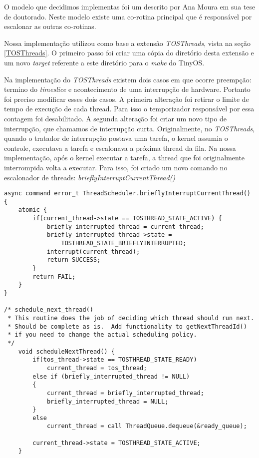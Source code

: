 O modelo que decidimos implementas foi um descrito por Ana Moura em sua tese de doutorado\cite[s. 6.2]{Moura/04}.
Neste modelo existe uma co-rotina principal que é responsável por escalonar as outras co-rotinas.

Nossa implementação utilizou como base a extensão \textit{TOSThreads}, vista na seção \ref{TOSThreads}. O primeiro passo
foi criar uma cópia do diretório desta extensão e um novo \textit{target} referente a este diretório para o \textit{make} do TinyOS.

Na implementação do \textit{TOSThreads} existem dois casos em que ocorre preempção: termino do \textit{timeslice} e
acontecimento de uma interrupção de hardware. Portanto foi preciso modificar esses dois casos.
A primeira alteração foi retirar o limite de tempo de execução de cada thread. Para isso o temporizador responsável por
essa contagem foi desabilitado.
A segunda alteração foi criar um novo tipo de interrupção, que chamamos de interrupção curta. Originalmente, no
\textit{TOSThreads}, quando o tratador de interrupção postava uma tarefa, o kernel assumia o controle, executava a
tarefa e escalonava a próxima thread da fila. Na nossa implementação, após o kernel executar a tarefa, a thread que foi
originalmente interrompida volta a executar. Para isso, foi criado um novo comando no escalonador de threads:
\textit{brieflyInterruptCurrentThread()}
\begin{lstlisting}
async command error_t ThreadScheduler.brieflyInterruptCurrentThread() {
    atomic {
        if(current_thread->state == TOSTHREAD_STATE_ACTIVE) {
            briefly_interrupted_thread = current_thread;
            briefly_interrupted_thread->state =
                TOSTHREAD_STATE_BRIEFLYINTERRUPTED;
            interrupt(current_thread);
            return SUCCESS;
        }
        return FAIL;
    }
}

/* schedule_next_thread()
 * This routine does the job of deciding which thread should run next.
 * Should be complete as is.  Add functionality to getNextThreadId() 
 * if you need to change the actual scheduling policy.
 */
    void scheduleNextThread() {
        if(tos_thread->state == TOSTHREAD_STATE_READY)
            current_thread = tos_thread;
        else if (briefly_interrupted_thread != NULL)
        {
            current_thread = briefly_interrupted_thread;
            briefly_interrupted_thread = NULL;
        }
        else
            current_thread = call ThreadQueue.dequeue(&ready_queue);

        current_thread->state = TOSTHREAD_STATE_ACTIVE;
    }

\end{lstlisting}

